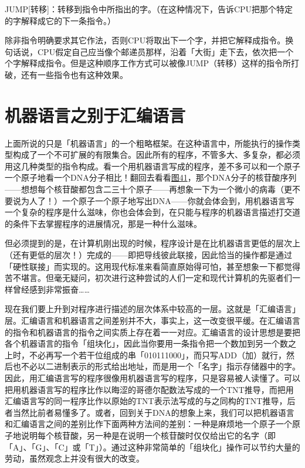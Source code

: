 \documentclass[
  12pt,
  twoside,
  openright,
  oldfontcommands,
]{memoir}
\begin{document}
JUMP{[}转移{]}：转移到指令中所指出的字。（在这种情况下，告诉CPU把那个特定的字解释成它的下一条指令。）

除非指令明确要求其它作法，否则CPU将取出下一个字，并把它解释成指令。换句话说，CPU假定自己应当像个邮递员那样，沿着「大街」走下去，依次把一个个字解释成指令。但是这种顺序工作方式可以被像JUMP（转移）这样的指令所打破，还有一些指令也有这种效果。

\section{机器语言之别于汇编语言}

上面所说的只是「机器语言」的一个粗略框架。在这种语言中，所能执行的操作类型构成了一个不可扩展的有限集合。因此所有的程序，不管多大、多复杂，都必须用这几种类型的指令构成。看一个用机器语言写成的程序，差不多可以和一个原子一个原子地看一个DNA分子相比！翻回去看看\hyperref[fig:41]{图41}，那个DNA分子的核苷酸序列------想想每个核苷酸都包含二三十个原子------再想象一下为一个微小的病毒（更不要说为人了！）一个原子一个原子地写出DNA------你就会体会到，用机器语言写一个复杂的程序是什么滋味，你也会体会到，在只能与程序的机器语言描述打交道的条件下去掌握程序的进展情况，那是一种什么滋味。

但必须提到的是，在计算机刚出现的时候，程序设计是在比机器语言更低的层次上（还有更低的层次！）完成的------即把导线彼此联接，因此恰当的操作都是通过「硬性联接」而实现的。这用现代标准来看简直原始得可怕，甚至想象一下都觉得苦不堪言。但毫无疑问，初次进行这种尝试的人们一定和现代计算机的先驱者们一样曾经感到非常振奋\ldots\ldots{}

现在我们要上升到对程序进行描述的层次体系中较高的一层。这就是「汇编语言」层。汇编语言和机器语言之间差别并不大，事实上，这一改变很平缓。在汇编语言的指令和机器语言的指令之间实质上存在着一一对应。汇编语言的设计思想是要把各个机器语言的指令「组块化」，因此当你要用一条指令把一个数加到另一个数之上时，不必再写一个若干位组成的串「010111000」，而只写ADD（加）就行，然后也不必以二进制表示的形式给出地址，而是用一个「名字」指示存储器中的字。因此，用汇编语言写的程序很像用机器语言写的程序，只是容易被人读懂了。可以把用机器语言写的程序比作以晦涩的哥德尔配数法写成的一个TNT推导，而把用汇编语言写的同一程序比作以原始的TNT表示法写成的与之同构的TNT推导，后者当然比前者易懂多了。或者，回到关于DNA的想象上来，我们可以把机器语言和汇编语言之间的差别比作下面两种方法间的差别：一种是麻烦地一个原子一个原子地说明每个核苷酸，另一种是在说明一个核苷酸时仅仅给出它的名字（即「A」、「G」、「C」或「T」）。通过这种非常简单的「组块化」操作可以节约大量的劳动，虽然观念上并没有很大的改变。
\end{document}
